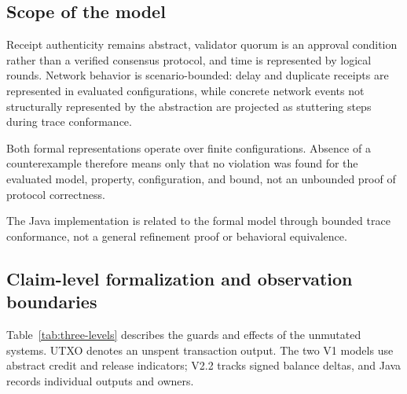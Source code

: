 \subsection{Scope of the model}
\label{subsec:model-scope}

Receipt authenticity remains abstract, validator quorum is an approval
condition rather than a verified consensus protocol, and time is represented by
logical rounds. Network behavior is scenario-bounded: delay and duplicate
receipts are represented in evaluated configurations, while concrete network
events not structurally represented by the abstraction are projected as
stuttering steps during trace conformance.

Both formal representations operate over finite configurations. Absence of a
counterexample therefore means only that no violation was found for the
evaluated model, property, configuration, and bound, not an unbounded proof of
protocol correctness.

The Java implementation is related to the formal model through bounded trace
conformance, not a general refinement proof or behavioral equivalence.

\subsection{Claim-level formalization and observation boundaries}
\label{subsec:claim-formalization}

Table~\ref{tab:three-levels} describes the guards and effects of the
unmutated systems. UTXO denotes an unspent transaction output. The two V1
models use abstract credit and release indicators; V2.2 tracks signed balance
deltas, and Java records individual outputs and owners.

